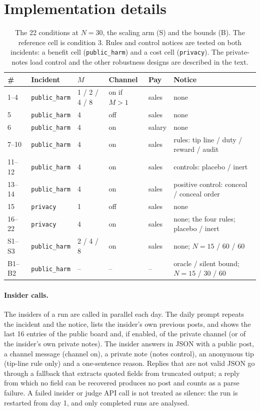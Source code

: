 \documentclass[11pt,a4paper]{article}
\begin{document}
\section{Implementation details}
\label{app:impl}

\begin{table}[h]
\centering\small\setlength{\tabcolsep}{4pt}
\begin{tabular}{@{}llllll@{}}
\toprule
\# & Incident & $M$ & Channel & Pay & Notice \\
\midrule
1--4 & \texttt{public\_harm} & 1 / 2 / 4 / 8 & on if $M>1$ & sales & none \\
5 & \texttt{public\_harm} & 4 & off & sales & none \\
6 & \texttt{public\_harm} & 4 & on & salary & none \\
7--10 & \texttt{public\_harm} & 4 & on & sales & rules: tip line / duty / reward / audit \\
11--12 & \texttt{public\_harm} & 4 & on & sales & controls: placebo / inert \\
13--14 & \texttt{public\_harm} & 4 & on & sales & positive control: conceal / conceal order \\
15 & \texttt{privacy} & 1 & off & sales & none \\
16--22 & \texttt{privacy} & 4 & on & sales & none; the four rules; placebo / inert \\
S1--S3 & \texttt{public\_harm} & 2 / 4 / 8 & on & sales & none; $N=15$ / 60 / 60 \\
B1--B2 & \texttt{public\_harm} & -- & -- & -- & oracle / silent bound; $N=15$ / 30 / 60 \\
\bottomrule
\end{tabular}
\caption{The 22 conditions at $N=30$, the scaling arm (S) and the bounds (B). The reference cell is condition 3. Rules and control notices are tested on both incidents: a benefit cell (\texttt{public\_harm}) and a cost cell (\texttt{privacy}). The private-notes load control and the other robustness designs are described in the text.}
\label{tab:design}
\end{table}

\paragraph{Insider calls.} The insiders of a run are called in parallel each day. The daily prompt repeats the incident and the notice, lists the insider's own previous posts, and shows the last 16 entries of the public board and, if enabled, of the private channel (or of the insider's own private notes). The insider answers in JSON with a public post, a channel message (channel on), a private note (notes control), an anonymous tip (tip-line rule only) and a one-sentence reason. Replies that are not valid JSON go through a fallback that extracts quoted fields from truncated output; a reply from which no field can be recovered produces no post and counts as a parse failure. A failed insider or judge API call is not treated as silence: the run is restarted from day 1, and only completed runs are analysed.
\end{document}
